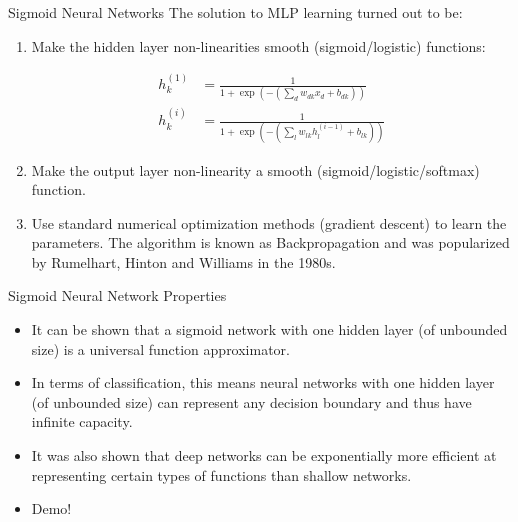 \documentclass[serif,xcolor=pdftex,dvipsnames,table,hyperref={bookmarks=false}]{beamer}
\begin{document}
\begin{frame}[t]{Sigmoid Neural Networks}
The solution to MLP learning turned out to be: 
\begin{enumerate}
\setlength{\itemsep}{8pt}

\item Make the hidden layer non-linearities smooth (sigmoid/logistic) functions:

\begin{align}
h^{(1)}_k &= \frac{1}{1+\exp(-(\sum_{d}w_{dk}x_d + b_{dk}))}\\
h^{(i)}_k &= \frac{1}{1+\exp(-(\sum_{l}w_{lk}h^{(i-1)}_l + b_{lk}))}
\end{align}

\pause \item Make the output layer non-linearity a smooth (sigmoid/logistic/softmax) function.

\pause \item Use standard numerical optimization methods (gradient descent) to learn the parameters. The algorithm is known as Backpropagation and was popularized by Rumelhart, Hinton and Williams in the 1980s.  
\end{enumerate}

\end{frame}

\begin{frame}[t]{Sigmoid Neural Network Properties} 
\begin{itemize}
\setlength{\itemsep}{8pt}

\item It can be shown that a sigmoid network with one hidden layer (of unbounded size) is a universal function approximator. 

\pause\item In terms of classification, this means neural networks with one hidden layer (of unbounded size) can represent any decision boundary and thus have infinite capacity.

\pause\item It was also shown that deep networks can be exponentially more efficient at representing certain types of functions than shallow networks.

\pause\item Demo!

\end{itemize}

\end{frame}
\end{document}
